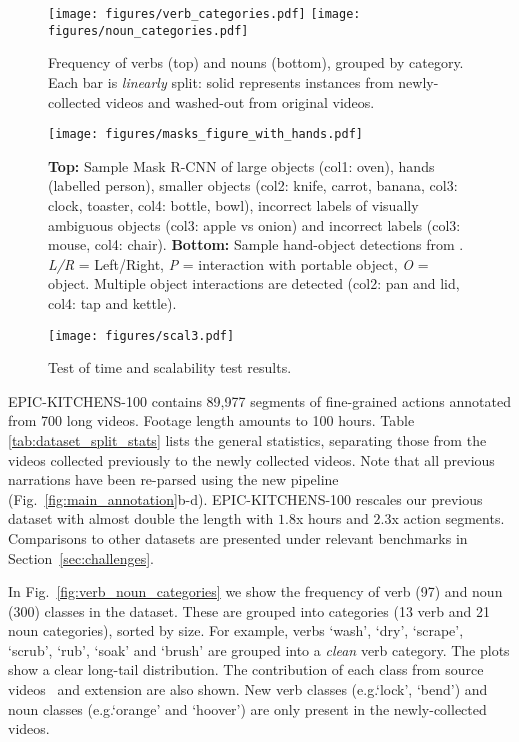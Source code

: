 \documentclass[twocolumn]{svjour3}          \smartqed
\makeatletter
\newcommand {\newDataset} {EPIC-KITCHENS-100}
\newcommand*{\eg}{e.g.\@\xspace}
\makeatother
\begin{document}
\begin{figure*}[t]
    \centering
    \texttt{[image: figures/verb\_categories.pdf]}
    \texttt{[image: figures/noun\_categories.pdf]}
    \caption{Frequency of verbs (top) and nouns (bottom), grouped by category. Each bar is \textit{linearly} split: solid represents instances from newly-collected videos and washed-out from original videos.}
    \label{fig:verb_noun_categories}
    \texttt{[image: figures/masks\_figure\_with\_hands.pdf]}
    \caption{\textbf{Top:} Sample Mask R-CNN of large objects (col1: oven), hands (labelled person), smaller objects (col2: knife, carrot, banana, col3: clock, toaster, col4: bottle, bowl), incorrect labels of visually ambiguous objects (col3: apple vs onion) and incorrect labels (col3: mouse, col4: chair).
    \textbf{Bottom:} Sample hand-object detections from \cite{Shan2020Understanding}. \textit{L/R} = Left/Right, \textit{P} = interaction with portable object, \textit{O} = object. Multiple object interactions are detected (col2: pan and lid, col4: tap and kettle).}
    \label{fig:masks}
\end{figure*}

\begin{figure*}[t]
    \begin{center}
    \texttt{[image: figures/scal3.pdf]}
    \caption{Test of time and scalability test results.}
    \label{fig:scalability}
    \end{center}
\end{figure*}

\newDataset{} contains 89,977 segments of fine-grained actions annotated from 700 long videos. 
Footage length amounts to 100 hours. 
Table \ref{tab:dataset_split_stats} lists the general statistics, separating those from the videos collected previously to the newly collected videos. Note that all previous narrations have been re-parsed using the new pipeline (Fig.~\ref{fig:main_annotation}b-d).
\newDataset{} rescales our previous dataset with almost double the length with $1.8$x hours and $2.3$x action segments. Comparisons to other datasets are presented under relevant benchmarks in Section~\ref{sec:challenges}.

In Fig.~\ref{fig:verb_noun_categories} we show the frequency of verb (97) and noun (300) classes in the dataset.
These are grouped into categories (13 verb and 21 noun categories), sorted by size. 
For example, verbs `wash', `dry', `scrape', `scrub', `rub', `soak' and `brush' are grouped into a \textit{clean} verb category. 
The plots show a clear long-tail distribution.
The contribution of each class from source videos~\cite{Damen2018EPICKITCHENS} and extension are also shown. 
New verb classes (\eg `lock', `bend') and noun classes (\eg `orange' and `hoover') are only present in the newly-collected videos.
\end{document}
